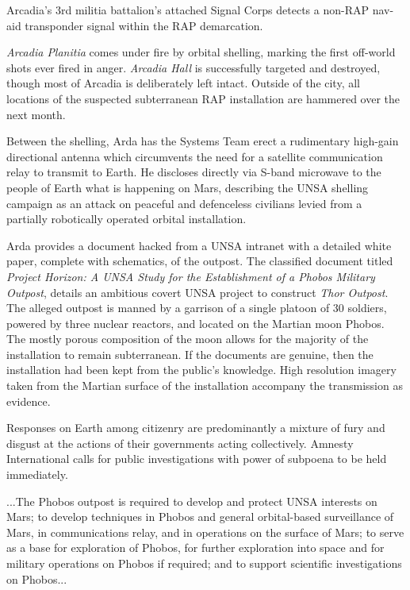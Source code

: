

Arcadia's 3rd militia battalion's attached Signal Corps detects a non-RAP nav-aid transponder signal within the RAP demarcation.
\StopTimelineDate

{\it Arcadia Planitia} comes under fire by orbital shelling, marking the first off-world shots ever fired in anger. {\it Arcadia Hall} is successfully targeted and destroyed, though most of Arcadia is deliberately left intact. Outside of the city, all locations of the suspected subterranean RAP installation are hammered over the next month.

Between the shelling, Arda has the Systems Team erect a rudimentary high-gain directional antenna which circumvents the need for a satellite communication relay to transmit to Earth. He discloses directly via S-band microwave to the people of Earth what is happening on Mars, describing the UNSA shelling campaign as an attack on peaceful and defenceless civilians levied from a partially robotically operated orbital installation.

Arda provides a document hacked from a UNSA intranet with a detailed white paper, complete with schematics, of the outpost. The classified document titled {\it Project Horizon: A UNSA Study for the Establishment of a Phobos Military Outpost}, details an ambitious covert UNSA project to construct {\it Thor Outpost}. The alleged outpost is manned by a garrison of a single platoon of 30 soldiers, powered by three nuclear reactors, and located on the Martian moon Phobos. The mostly porous composition of the moon allows for the majority of the installation to remain subterranean. If the documents are genuine, then the installation had been kept from the public's knowledge. High resolution imagery taken from the Martian surface of the installation accompany the transmission as evidence.

Responses on Earth among citizenry are predominantly a mixture of fury and disgust at the actions of their governments acting collectively. Amnesty International calls for public investigations with power of subpoena to be held immediately.

\startTimelineGeneralDocument
...The Phobos outpost is required to develop and protect UNSA interests on Mars; to develop techniques in Phobos and general orbital-based surveillance of Mars, in communications relay, and in operations on the surface of Mars; to serve as a base for exploration of Phobos, for further exploration into space and for military operations on Phobos if required; and to support scientific investigations on Phobos...

